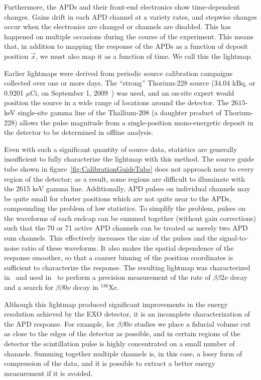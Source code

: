 Furthermore, the APDs and their front-end electronics show time-dependent changes. Gains drift in each APD channel at a variety rates, and stepwise changes occur when the electronics are changed or channels are disabled. This has happened on multiple occasions during the course of the experiment.  This means that, in addition to mapping the response of the APDs as a function of deposit position $\vec{x}$, we must also map it as a function of  time. We call this the lightmap.

Earlier lightmaps were derived from periodic source calibration campaigns collected over one or more days. The ``strong'' Thorium-228 source ($34.04$ kBq, or 0.9201 $\mu$Ci, on September 1, 2009~\cite{SourceCertificates}) was used, and an on-site expert would  position the source in a wide range of locations around the detector.  The $2615$-keV single-site gamma line of the Thallium-208 (a daughter product of Thorium-228) allows the pulse magnitude from a single-position mono-energetic deposit in the detector to be determined in offline analysis.

Even with such a significant quantity of source data, statistics are generally insufficient to fully characterize the lightmap with this method.  The source guide tube shown in figure~\ref{fig:CalibrationGuideTube} does not approach near to every region of the detector; as a result, some regions are difficult to illuminate with the 2615 keV gamma line.  Additionally, APD pulses on individual channels may be quite small for cluster positions which are not quite near to the APDs, compounding the problem of low statistics.  To simplify the problem, pulses on the waveforms of each endcap can be summed together (without gain corrections) such that the 70 or 71 active APD channels can be treated as merely two APD sum channels.  This effectively increases the size of the pulses and the signal-to-noise ratio of these waveforms. It also makes the spatial dependence of the response smoother, so that a coarser binning of the position coordinates is sufficient to characterize the response.  The resulting lightmap was characterized in~\cite{ThesisSteve} and used in~\cite{bb0nSearch2012,bb2nEXO2014} to perform a precision measurement of the rate of $\beta\beta 2\nu$ decay and a search for $\beta\beta 0\nu$ decay in $^{136}$Xe.

Although this lightmap produced significant improvements in the energy resolution achieved by the EXO detector,  it is an incomplete characterization of the APD response.  For example, for $\beta\beta0\nu$ studies we place a fiducial volume cut as close to the edges of the detector as possible, and in certain regions of the detector the scintillation pulse is highly concentrated on a small number of channels.  Summing together multiple channels is, in this case, a lossy form of compression of the data, and it is possible to extract a better energy measurement if it is avoided.

